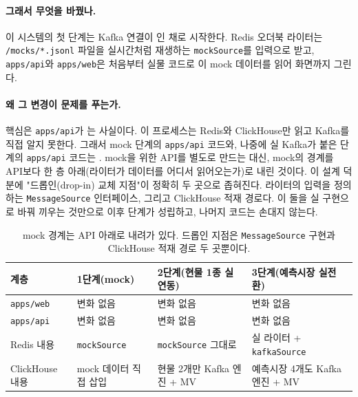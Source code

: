 \paragraph{그래서 무엇을 바꿨나.} 이 시스템의 첫 단계는 Kafka 연결이 인
채로 시작한다. Redis 오더북 라이터는 \texttt{/mocks/*.jsonl} 파일을 실시간처럼
재생하는 \texttt{mockSource}를 입력으로 받고, \texttt{apps/api}와 \texttt{apps/web}은
처음부터 실물 코드로 이 mock 데이터를 읽어 화면까지 그린다.

\paragraph{왜 그 변경이 문제를 푸는가.} 핵심은 \texttt{apps/api}가 는 사실이다. 이 프로세스는 Redis와 ClickHouse만 읽고 Kafka를 직접
알지 못한다. 그래서 mock 단계의 \texttt{apps/api} 코드와, 나중에 실 Kafka가 붙은
단계의 \texttt{apps/api} 코드는 . mock을 위한 API를 별도로
만드는 대신, mock의 경계를 API보다 한 층 아래(라이터가 데이터를 어디서 읽어오는가)로
내린 것이다. 이 설계 덕분에 "드롭인(drop-in) 교체 지점"이 정확히 두 곳으로
좁혀진다. 라이터의 입력을 정의하는 \texttt{MessageSource} 인터페이스, 그리고
ClickHouse 적재 경로다. 이 둘을 실 구현으로 바꿔 끼우는 것만으로 이후 단계가
성립하고, 나머지 코드는 손대지 않는다.

\begin{table}[htbp]
  \centering
  \small
  \begin{tabularx}{\linewidth}{@{}lXXX@{}}
    \toprule
    계층 & 1단계(mock) & 2단계(현물 1종 실연동) & 3단계(예측시장 실전환) \\
    \midrule
    \texttt{apps/web} & 변화 없음 & 변화 없음 & 변화 없음 \\
    \texttt{apps/api} & 변화 없음 & 변화 없음 & 변화 없음 \\
    Redis 내용 & \texttt{mockSource} & \texttt{mockSource} 그대로 & 실 라이터 +
      \texttt{kafkaSource} \\
    ClickHouse 내용 & mock 데이터 직접 삽입 & 현물 2개만 Kafka 엔진 + MV &
      예측시장 4개도 Kafka 엔진 + MV \\
    \bottomrule
  \end{tabularx}
  \caption{mock 경계는 API 아래로 내려가 있다. 드롭인 지점은 \texttt{MessageSource}
    구현과 ClickHouse 적재 경로 두 곳뿐이다.}
  \label{tab:arch-mock-ladder}
\end{table}

